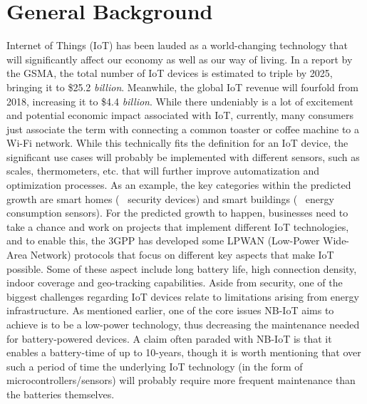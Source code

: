 






\section{General Background}
Internet of Things (IoT) has been lauded as a world-changing technology that will significantly affect our economy as well as our way of living. In a report by the GSMA, the total number of IoT devices is estimated to triple by 2025, bringing it to \$25.2 \textit{billion}.\cite{gsma-report} Meanwhile, the global IoT revenue will fourfold from 2018, increasing it to \$4.4 \textit{billion}.\cite{gsma-report} While there undeniably is a lot of excitement and potential economic impact associated with IoT, currently, many consumers just associate the term with connecting a common toaster or coffee machine to a Wi-Fi network. While this technically fits the definition for an IoT device,\cite{what_is_iot} the significant use cases will probably be implemented with different sensors, such as scales, thermometers, etc. that will further improve automatization and optimization processes. As an example, the key categories within the predicted growth are smart homes (\eg~ security devices) and smart buildings (\eg~ energy consumption sensors).\cite{gsma-report} For the predicted growth to happen, businesses need to take a chance and work on projects that implement different IoT technologies, and to enable this, the 3GPP has developed some LPWAN (Low-Power Wide-Area Network) protocols that focus on different key aspects that make IoT possible. Some of these aspect include long battery life, high connection density, indoor coverage and geo-tracking capabilities. Aside from security, one of the biggest challenges regarding IoT devices relate to limitations arising from energy infrastructure. As mentioned earlier, one of the core issues NB-IoT aims to achieve is to be a low-power technology, thus decreasing the maintenance needed for battery-powered devices. A claim often paraded with NB-IoT is that it enables a battery-time of up to 10-years,\cite{gsma-nb-iot} though it is worth mentioning that over such a period of time the underlying IoT technology (in the form of microcontrollers/sensors) will probably require more frequent maintenance than the batteries themselves.

